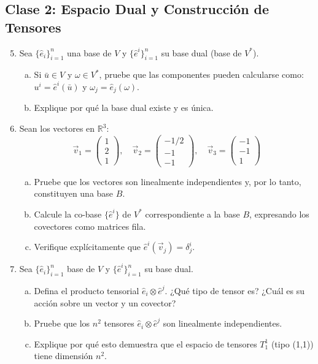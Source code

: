 \documentclass[12pt,a4paper]{article}
\begin{document}
\subsection*{Clase 2: Espacio Dual y Construcción de Tensores}

\begin{enumerate}[1.]
\setcounter{enumi}{4}
\item Sea $\{\hat{e}_i\}_{i=1}^n$ una base de $V$ y $\{\hat{e}^i\}_{i=1}^n$ su base dual (base de $V^*$).
\begin{enumerate}[a)]
\item Si $\bar{u}\in V$ y $\omega\in V^*$, pruebe que las componentes pueden calcularse como: $u^i = \hat{e}^i(\bar{u})$ y $\omega_j = \hat{e}_j(\omega)$.
\item Explique por qué la base dual existe y es única.
\end{enumerate}

\item Sean los vectores en $\mathbb{R}^3$:
\[
\vec{v}_1=\begin{pmatrix}1 \\ 2 \\ 1\end{pmatrix},\quad
\vec{v}_2=\begin{pmatrix}-1/2 \\ -1 \\ -1\end{pmatrix},\quad
\vec{v}_3=\begin{pmatrix}-1 \\ -1 \\ 1\end{pmatrix}
\]
\begin{enumerate}[a)]
\item Pruebe que los vectores son linealmente independientes y, por lo tanto, constituyen una base $B$.
\item Calcule la co-base $\{\hat{e}^i\}$ de $V^*$ correspondiente a la base $B$, expresando los covectores como matrices fila.
\item Verifique explícitamente que $\hat{e}^i(\vec{v}_j) = \delta^i_j$.
\end{enumerate}

\item Sea $\{\hat{e}_i\}_{i=1}^n$ base de $V$ y $\{\hat{e}^i\}_{i=1}^n$ su base dual.
\begin{enumerate}[a)]
\item Defina el producto tensorial $\hat{e}_i \otimes \hat{e}^j$. ¿Qué tipo de tensor es? ¿Cuál es su acción sobre un vector y un covector?
\item Pruebe que los $n^2$ tensores $\hat{e}_i \otimes \hat{e}^j$ son linealmente independientes.
\item Explique por qué esto demuestra que el espacio de tensores $T_1^1$ (tipo (1,1)) tiene dimensión $n^2$.
\end{enumerate}


\end{enumerate}
\end{document}
